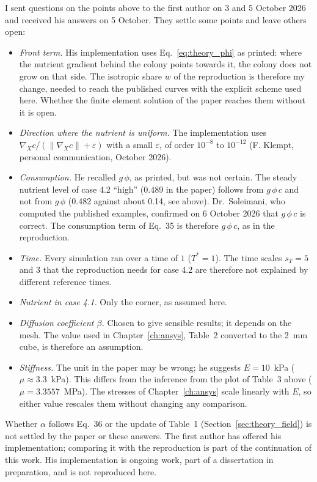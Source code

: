 I sent questions on the points above to the first author on 3 and 5 October 2026 and
received his answers on 5 October. They settle some points and leave others
open:
\begin{itemize}
  \item \emph{Front term.} His implementation uses Eq.~\eqref{eq:theory_phi}
        as printed: where the nutrient gradient behind the colony points
        towards it, the colony does not grow on that side. The isotropic
        share $w$ of the reproduction is therefore my change, needed to
        reach the published curves with the explicit scheme used here.
        Whether the finite element solution of the paper reaches them
        without it is open.
  \item \emph{Direction where the nutrient is uniform.} The implementation
        uses $\nabla_X c/(\|\nabla_X c\|+\varepsilon)$ with a small
        $\varepsilon$, of order $10^{-8}$ to $10^{-12}$ (F. Klempt, personal
        communication, October 2026).
  \item \emph{Consumption.} He recalled $g\,\phi$, as printed, but was not
        certain. The steady nutrient level of case 4.2 ``high'' (0.489 in
        the paper) follows from $g\,\phi\,c$ and not from $g\,\phi$
        (0.482 against about 0.14, see above). Dr.\ Soleimani, who computed the
        published examples, confirmed on 6 October 2026 that $g\,\phi\,c$
        is correct. The consumption term of Eq.~35 is therefore
        $g\,\phi\,c$, as in the reproduction.
  \item \emph{Time.} Every simulation ran over a time of $1$ ($T^*=1$). The time
        scales $s_T=5$ and $3$ that the reproduction needs for case 4.2 are
        therefore not explained by different reference times.
  \item \emph{Nutrient in case 4.1.} Only the corner, as assumed here.
  \item \emph{Diffusion coefficient $\beta$.} Chosen to give sensible
        results; it depends on the mesh. The value used in
        Chapter~\ref{ch:ansys}, Table~2 converted to the 2~mm cube, is
        therefore an assumption.
  \item \emph{Stiffness.} The unit in the paper may be wrong; he suggests
        $E=10$~kPa ($\mu\approx3.3$~kPa). This differs from the inference
        from the plot of Table~3 above ($\mu=3.3557$~MPa). The stresses of
        Chapter~\ref{ch:ansys} scale linearly with $E$, so either value
        rescales them without changing any comparison.
\end{itemize}
Whether $\alpha$ follows Eq.~36 or the update of Table~1
(Section~\ref{sec:theory_field}) is not settled by the paper or these answers. The first author has
offered his implementation; comparing it with the reproduction is part of
the continuation of this work. His implementation is ongoing work, part of a
dissertation in preparation, and is not reproduced here.

